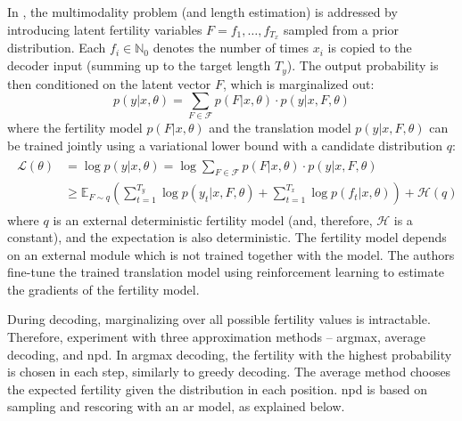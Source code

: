 In \citet{gu2017nonautoregressive}, the multimodality problem (and length
estimation) is addressed by introducing latent fertility variables
$F = f_1, \ldots, f_{T_x}$ sampled from a prior distribution. Each
$f_i \in \mathbb{N}_0$ denotes the number of times $x_i$ is copied to the
decoder input (summing up to the target length $T_y$). The output probability
is then conditioned on the latent vector $F$, which is marginalized out:
%
\begin{equation}
  p(y|x, \theta) = \sum_{F \in \mathcal{F}} p(F|x, \theta) \cdot p(y|x, F, \theta)
\end{equation}
%
where the fertility model $p(F|x, \theta)$ and the translation model
$p(y|x, F, \theta)$ can be trained jointly using a variational lower bound with
a candidate distribution $q$:
\begin{align}
  \begin{split}
    \mathcal{L}(\theta)
    & = \log p(y|x, \theta) = \log \sum_{F \in \mathcal{F}} p(F| x, \theta ) \cdot p(y | x, F, \theta) \\
    & \geq \mathbb{E}_{F \sim q} \left(\sum_{t=1}^{T_y} \log p(y_t | x, F,
      \theta) + \sum_{t=1}^{T_x} \log p(f_t | x, \theta) \right) +
    \mathcal{H}(q)
  \end{split}
\end{align}
%
where $q$ is an external deterministic fertility model (and, therefore,
$\mathcal{H}$ is a constant), and the expectation is also deterministic.
%
The fertility model depends on an external module which is not trained together
with the model. The authors fine-tune the trained translation model using
reinforcement learning \citep{williams1992simple} to estimate the gradients of
the fertility model.

During decoding, marginalizing over all possible fertility values is
intractable. Therefore, \citet{gu2017nonautoregressive} experiment with three
approximation methods -- argmax, average decoding, and \ac{npd}. In argmax
decoding, the fertility with the highest probability is chosen in each step,
similarly to greedy decoding. The average method chooses the expected fertility
given the distribution in each position. \ac{npd} is based on sampling and
rescoring with an \acl{ar} model, as explained below.


